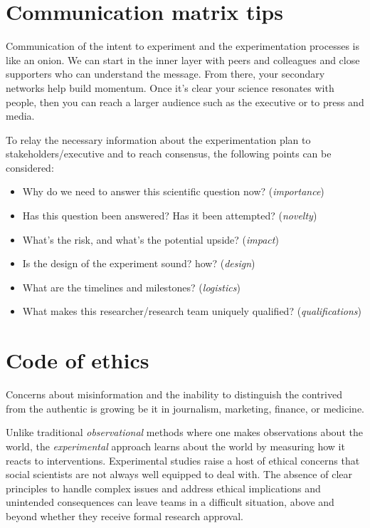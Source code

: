 \documentclass[openany]{book}
\providecommand{\tightlist}{%
  \setlength{\itemsep}{0pt}\setlength{\parskip}{0pt}}
\begin{document}
\hypertarget{communication-matrix-tips}{%
\section{Communication matrix tips}\label{communication-matrix-tips}}

Communication of the intent to experiment and the experimentation processes is like an onion. We can start in the inner layer with peers and colleagues and close supporters who can understand the message. From there, your secondary networks help build momentum. Once it's clear your science resonates with people, then you can reach a larger audience such as the executive or to press and media.

To relay the necessary information about the experimentation plan to stakeholders/executive and to reach consensus, the following points can be considered:

\begin{itemize}
\tightlist
\item
  Why do we need to answer this scientific question now? (\emph{importance})
\item
  Has this question been answered? Has it been attempted? (\emph{novelty})
\item
  What's the risk, and what's the potential upside? (\emph{impact})
\item
  Is the design of the experiment sound? how? (\emph{design})
\item
  What are the timelines and milestones? (\emph{logistics})
\item
  What makes this researcher/research team uniquely qualified? (\emph{qualifications})
\end{itemize}

\hypertarget{code-of-ethics}{%
\section{Code of ethics}\label{code-of-ethics}}

Concerns about misinformation and the inability to distinguish the contrived from the authentic is growing be it in journalism, marketing, finance, or medicine.

Unlike traditional \emph{observational} methods where one makes observations about the world, the \emph{experimental} approach learns about the world by measuring how it reacts to interventions. Experimental studies raise a host of ethical concerns that social scientists are not always well equipped to deal with. The absence of clear principles to handle complex issues and address ethical implications and unintended consequences can leave teams in a difficult situation, above and beyond whether they receive formal research approval.
\end{document}
